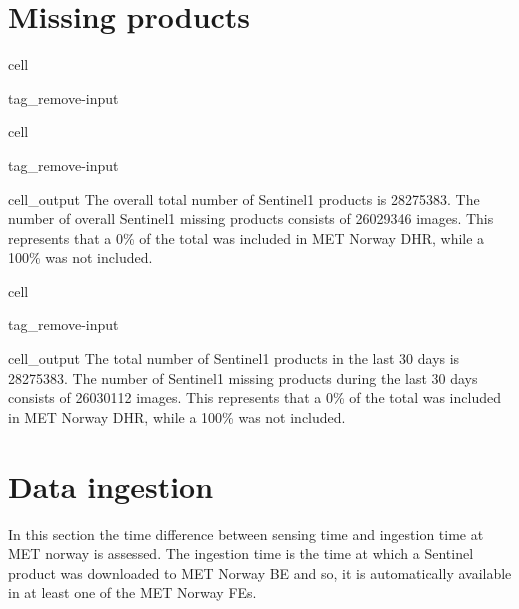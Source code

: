 \documentclass[letterpaper,10pt,english]{jupyterBook}
\begin{document}
\section{Missing products}
\label{\detokenize{S1_portals:missing-products}}
\begin{sphinxuseclass}{cell}
\begin{sphinxuseclass}{tag_remove-input}
\end{sphinxuseclass}
\end{sphinxuseclass}
\begin{sphinxuseclass}{cell}
\begin{sphinxuseclass}{tag_remove-input}\begin{sphinxVerbatimOutput}

\begin{sphinxuseclass}{cell_output}
\sphinxAtStartPar
The overall total number of Sentinel\sphinxhyphen{}1 products is 28275383. The number of overall Sentinel\sphinxhyphen{}1 missing products consists of 26029346 images. This represents that a 0\% of the total was included in MET Norway DHR, while a 100\% was not included.

\end{sphinxuseclass}\end{sphinxVerbatimOutput}

\end{sphinxuseclass}
\end{sphinxuseclass}
\begin{sphinxuseclass}{cell}
\begin{sphinxuseclass}{tag_remove-input}\begin{sphinxVerbatimOutput}

\begin{sphinxuseclass}{cell_output}
\sphinxAtStartPar
The total number of Sentinel\sphinxhyphen{}1 products in the last 30 days is 28275383. The number of Sentinel\sphinxhyphen{}1 missing products during the last 30 days consists of 26030112 images. This represents that a 0\% of the total was included in MET Norway DHR, while a 100\% was not included.

\end{sphinxuseclass}\end{sphinxVerbatimOutput}

\end{sphinxuseclass}
\end{sphinxuseclass}

\section{Data ingestion}
\label{\detokenize{S1_portals:data-ingestion}}
\sphinxAtStartPar
In this section the time difference between sensing time and ingestion time at MET norway is assessed. The ingestion time is the time at which a Sentinel product was downloaded to MET Norway BE and so, it is automatically available in at least one of the MET Norway FEs.
\end{document}
